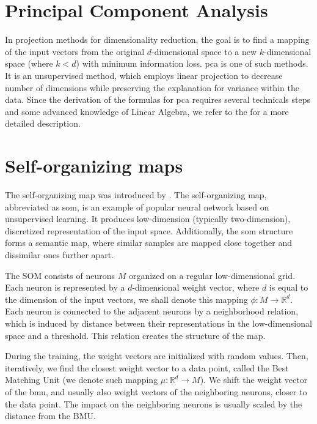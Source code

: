\section{Principal Component Analysis}
\label{s:pca}

In projection methods for dimensionality reduction, the goal is to find a mapping of the input vectors from the original $d$-dimensional space to a new $k$-dimensional space (where $k < d$) with minimum information loss. \acrshort{pca} is one of such methods. It is an unsupervised method, which employs linear projection to decrease number of dimensions while preserving the explanation for variance within the data. Since the derivation of the formulas for \acrshort{pca} requires several technicals steps and some advanced knowledge of Linear Algebra, we refer to the \cite{alpaydin2020introduction} for a more detailed description.

\section{Self-organizing maps}
\label{s:som}

The self-organizing map was introduced by \cite{kohonen1982self}. The self-organizing map, abbreviated as \acrshort{som}, is an example of popular neural network based on unsupervised learning.  It produces low-dimension (typically two-dimension), discretized representation of the input space. Additionally, the \acrlong{som} structure forms a semantic map, where similar samples are mapped close together and dissimilar ones further apart.

The SOM consists of neurons $M$ organized on a regular low-dimensional grid. Each neuron is represented by a $d$-dimensional weight vector, where $d$ is equal to the dimension of the input vectors, we shall denote this mapping $\phi: M \rightarrow \mathbb{R}^d$. Each neuron is connected to the adjacent neurons by a neighborhood relation, which is induced by distance between their representations in the low-dimensional space and a threshold. This relation creates the structure of the map. 

During the training, the weight vectors are initialized with random values. Then, iteratively, we find the closest weight vector to a data point, called the Best Matching Unit (we denote such mapping $\mu: \mathbb{R}^d \rightarrow M$). We shift the weight vector of the \acrshort{bmu}, and usually also weight vectors of the neighboring neurons, closer to the data point. The impact on the neighboring neurons is usually scaled by the distance from the BMU.

